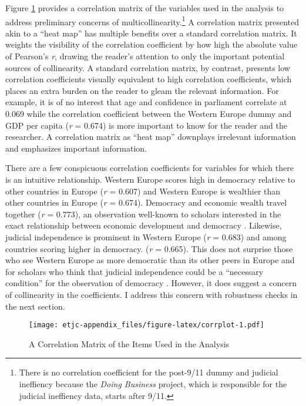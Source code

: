 \documentclass[11pt,]{article}
\makeatletter
\def\maxwidth{\ifdim\Gin@nat@width>\linewidth\linewidth
\else\Gin@nat@width\fi}
\let\Oldincludegraphics\includegraphics
\renewcommand{\includegraphics}[1]{\Oldincludegraphics[width=\maxwidth]{#1}}
\makeatother
\begin{document}
Figure \ref{fig:corrmat} provides a correlation matrix of the variables
used in the analysis to address preliminary concerns of
multicollinearity.\footnote{There is no correlation coefficient for the
  post-9/11 dummy and judicial ineffiency because the \emph{Doing
  Business} project, which is responsible for the judicial ineffiency
  data, starts after 9/11.} A correlation matrix presented akin to a
``heat map'' has multiple benefits over a standard correlation matrix.
It weights the visibility of the correlation coefficient by how high the
absolute value of Pearson's \emph{r}, drawing the reader's attention to
only the important potential sources of collinearity. A standard
correlation matrix, by contrast, presents low correlation coefficients
visually equivalent to high correlation coefficients, which places an
extra burden on the reader to gleam the relevant information. For
example, it is of no interest that age and confidence in parliament
correlate at 0.069 while the correlation coefficient between the Western
Europe dummy and GDP per capita (\emph{r} = 0.674) is more important to
know for the reader and the researcher. A correlation matrix as ``heat
map'' downplays irrelevant information and emphasizes important
information.

There are a few conspicuous correlation coefficients for variables for
which there is an intuitive relationship. Western Europe scores high in
democracy relative to other countries in Europe (\emph{r} = 0.607) and
Western Europe is wealthier than other countries in Europe (\emph{r} =
0.674). Democracy and economic wealth travel together (\emph{r} =
0.773), an observation well-known to scholars interested in the exact
relationship between economic development and democracy
\citep[e.g.][]{przeworskietal2000dd}. Likewise, judicial independence is
prominent in Western Europe (\emph{r} = 0.683) and among countries
scoring higher in democracy. (\emph{r} = 0.665). This does not surprise
those who see Western Europe as more democratic than its other peers in
Europe and for scholars who think that judicial independence could be a
``necessary condition'' for the observation of democracy
\citep[e.g.][]{howardcasey2003ijnd}. However, it does suggest a concern
of collinearity in the coefficients. I address this concern with
robustness checks in the next section.

\begin{figure}[htbp]
\centering
\texttt{[image: etjc-appendix\_files/figure-latex/corrplot-1.pdf]}
\caption{\label{fig:corrmat} A Correlation Matrix of the Items Used in
the Analysis}
\end{figure}
\end{document}
